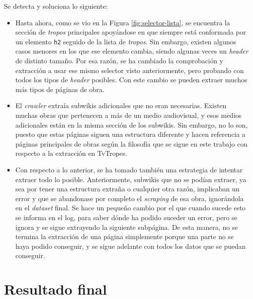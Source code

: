 Se detecta y soluciona lo siguiente:
\begin{itemize}
    \item Hasta ahora, como se vio en la Figura \ref{fig:selector-lista}, se
    encuentra la sección de \textit{tropos} principales apoyándose en que
    siempre está conformada por un elemento \texttt{h2} seguido de la lista de
    \textit{tropos}. Sin embargo, existen algunos casos menores en los que ese
    elemento cambia, siendo algunas veces un \textit{header} de distinto tamaño.
    Por esa razón, se ha cambiado la comprobación y extracción a usar ese mismo
    selector visto anteriormente, pero probando con todos los tipos de
    \textit{header} posibles. Con este cambio se pueden extraer muchos más tipos
    de páginas de obra.
    \item El \textit{crawler} extraía subwikis adicionales que no eran
    necesarias. Existen muchas obras que pertenecen a más de un medio
    audiovisual, y esos medios adicionales están en la misma sección de los
    subwikis. Sin embargo, no lo son, puesto que estas páginas siguen una
    estructura diferente y hacen referencia a páginas principales de obras según
    la filosofía que se sigue en este trabajo con respecto a la extracción en
    TvTropes.
    \item Con respecto a lo anterior, se ha tomado también una estrategia de
    intentar extraer todo lo posible. Anteriormente, subwikis que no se podían
    extraer, ya sea por tener una estructura extraña o cualquier otra razón,
    implicaban un error y que se abandonase por completo el \textit{scraping} de
    esa obra, ignorándola en el \textit{dataset} final. Se hace un pequeño
    cambio por el que cuando sucede esto se informa en el log, para saber dónde
    ha podido suceder un error, pero se ignora y se sigue extrayendo la siguiente
    subpágina. De esta manera, no se termina la extracción de una página
    simplemente porque una parte no se haya podido conseguir, y se sigue
    adelante con todos los datos que se puedan conseguir.  
\end{itemize}

\section{Resultado final}